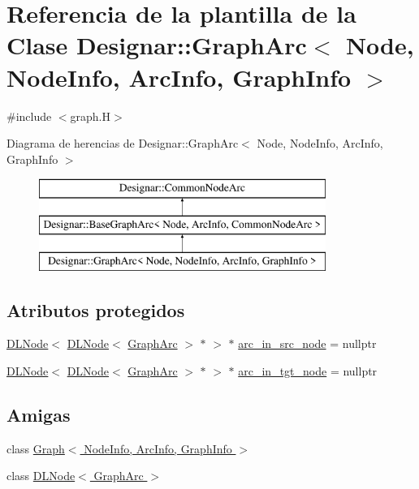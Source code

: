 \hypertarget{class_designar_1_1_graph_arc}{}\section{Referencia de la plantilla de la Clase Designar\+:\+:Graph\+Arc$<$ Node, Node\+Info, Arc\+Info, Graph\+Info $>$}
\label{class_designar_1_1_graph_arc}


{\ttfamily \#include $<$graph.\+H$>$}

Diagrama de herencias de Designar\+:\+:Graph\+Arc$<$ Node, Node\+Info, Arc\+Info, Graph\+Info $>$\begin{figure}[H]
\begin{center}
\leavevmode
\includegraphics[height=3.000000cm]{class_designar_1_1_graph_arc}
\end{center}
\end{figure}
\subsection*{Atributos protegidos}
\begin{DoxyCompactItemize}
\item 
\hyperlink{class_designar_1_1_d_l_node}{D\+L\+Node}$<$ \hyperlink{class_designar_1_1_d_l_node}{D\+L\+Node}$<$ \hyperlink{class_designar_1_1_graph_arc}{Graph\+Arc} $>$ $\ast$ $>$ $\ast$ \hyperlink{class_designar_1_1_graph_arc_addbd9ebec2787d3950aa679acf392fc6}{arc\+\_\+in\+\_\+src\+\_\+node} = nullptr
\item 
\hyperlink{class_designar_1_1_d_l_node}{D\+L\+Node}$<$ \hyperlink{class_designar_1_1_d_l_node}{D\+L\+Node}$<$ \hyperlink{class_designar_1_1_graph_arc}{Graph\+Arc} $>$ $\ast$ $>$ $\ast$ \hyperlink{class_designar_1_1_graph_arc_a49385be5572e3c6dd2d22309ef5fd79a}{arc\+\_\+in\+\_\+tgt\+\_\+node} = nullptr
\end{DoxyCompactItemize}
\subsection*{Amigas}
\begin{DoxyCompactItemize}
\item 
class \hyperlink{class_designar_1_1_graph_arc_a0a9834688687d864501bbb9c85b0d32c}{Graph$<$ Node\+Info, Arc\+Info, Graph\+Info $>$}
\item 
class \hyperlink{class_designar_1_1_graph_arc_a94936ca2e45f109cf3805a93858fbc75}{D\+L\+Node$<$ Graph\+Arc $>$}
\end{DoxyCompactItemize}
